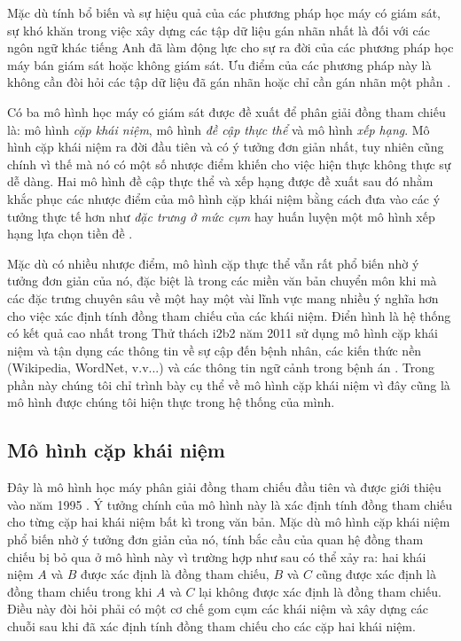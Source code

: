 Mặc dù tính bổ biến và sự hiệu quả của các phương pháp học máy có giám sát, sự khó khăn trong việc xây dựng các tập dữ liệu gán nhãn nhất là đối với các ngôn ngữ khác tiếng Anh đã làm động lực cho sự ra đời của các phương pháp học máy bán giám sát hoặc không giám sát. Ưu điểm của các phương pháp này là không cần đòi hỏi các tập dữ liệu đã gán nhãn hoặc chỉ cần gán nhãn một phần \cite{CardieWagstaff1999}.

Có ba mô hình học máy có giám sát được đề xuất để phân giải đồng tham chiếu là: mô hình \emph{cặp khái niệm}, mô hình \emph{đề cập thực thể} và mô hình \emph{xếp hạng}. Mô hình cặp khái niệm ra đời đầu tiên và có ý tưởng đơn giản nhất, tuy nhiên cũng chính vì thế mà nó có một số nhược điểm khiến cho việc hiện thực không thực sự dễ dàng. Hai mô hình đề cập thực thể và xếp hạng được đề xuất sau đó nhằm khắc phục các nhược điểm của mô hình cặp khái niệm bằng cách đưa vào các ý tưởng thực tế hơn như \emph{đặc trưng ở mức cụm} \cite{Yang2004} hay huấn luyện một mô hình xếp hạng lựa chọn tiền đề \cite{Yang2003}.

Mặc dù có nhiều nhược điểm, mô hình cặp thực thể vẫn rất phổ biến nhờ ý tưởng đơn giản của nó, đặc biệt là trong các miền văn bản chuyển môn khi mà các đặc trưng chuyên sâu về một hay một vài lĩnh vực mang nhiều ý nghĩa hơn cho việc xác định tính đồng tham chiếu của các khái niệm. Điển hình là hệ thống có kết quả cao nhất trong Thử thách i2b2 năm 2011 sử dụng mô hình cặp khái niệm và tận dụng các thông tin về sự cập đến bệnh nhân, các kiến thức nền (Wikipedia, WordNet, v.v...) và các thông tin ngữ cảnh trong bệnh án \cite{YanXu2012}. Trong phần này chúng tôi chỉ trình bày cụ thể về mô hình cặp khái niệm vì đây cũng là mô hình được chúng tôi hiện thực trong hệ thống của mình.

\subsection*{Mô hình cặp khái niệm}
Đây là mô hình học máy phân giải đồng tham chiếu đầu tiên và được giới thiệu vào năm 1995 \cite{Aone&Bennett1995}. Ý tưởng chính của mô hình này là xác định tính đồng tham chiếu cho từng cặp hai khái niệm bất kì trong văn bản. Mặc dù mô hình cặp khái niệm phổ biến nhờ ý tưởng đơn giản của nó, tính bắc cầu của quan hệ đồng tham chiếu bị bỏ qua ở mô hình này vì trường hợp như sau có thể xảy ra: hai khái niệm $A$ và $B$ được xác định là đồng tham chiếu, $B$ và $C$ cũng được xác định là đồng tham chiếu trong khi $A$ và $C$ lại không được xác định là đồng tham chiếu. Điều này đòi hỏi phải có một cơ chế gom cụm các khái niệm và xây dựng các chuỗi sau khi đã xác định tính đồng tham chiếu cho các cặp hai khái niệm.

